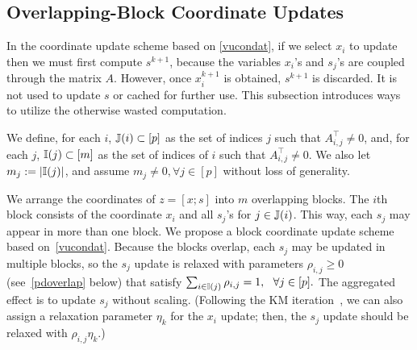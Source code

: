 {{\subsection{Overlapping-Block Coordinate Updates}\label{sec:overlap}
{In the coordinate update scheme based on \eqref{vucondat}, if we select $x_i$ to update then we must first compute $s^{k+1}$, because the variables   $x_i$'s and $s_j$'s are coupled through the matrix $A$. However, once $x_i^{k+1}$ is obtained, $s^{k+1}$  is discarded. It is not used to update $s$ or  cached for further use. This subsection introduces ways to utilize the otherwise wasted computation. %

We define, for each $i$,  $\mathbb{J}(i)\subset [p]$ as the set of indices $ j$ such that $A^\top_{i,j}\neq 0$, and, for each $j$,  $\mathbb{I}(j)\subset [m]$ as the set of indices of $i$ such that $A^\top_{i,j}\neq 0$. We also let $m_j:=|\mathbb{I}(j)|$, and assume $m_j\neq 0,\forall j \in [p]$ without loss of generality.

We arrange the coordinates of $z=[x;s]$ into $m$ overlapping blocks. The $i$th block consists of the coordinate $x_i$ and  all $s_j$'s for $j\in\mathbb{J}(i)$. This way, each $s_j$ may appear in more than one block. We propose a block coordinate update scheme based on~\eqref{vucondat}. Because the blocks overlap, each $s_j$ may be updated in multiple blocks, so the $s_j$ update is relaxed with parameters $\rho_{i,j}\ge 0$ (see~\eqref{pdoverlap} below) that satisfy  $\sum_{i\in \mathbb{I}(j)}\rho_{i,j}=1,~~\forall j \in [p].$ The aggregated effect is to update $s_j$ without scaling. (Following the
KM iteration~\cite{krasnosel1955two}, we can also assign a relaxation parameter $\eta_k$ for the $x_i$ update; then, the $s_j$ update should be relaxed with $\rho_{i,j}\eta_k$.)

}}}
